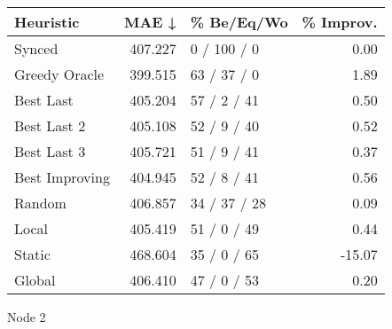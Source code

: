 \begin{tabular}{lrlr}
\toprule
\textbf{Heuristic} & \textbf{MAE ↓} & \textbf{\% Be/Eq/Wo} & \textbf{\% Improv.} \\
\midrule
            Synced &        407.227 &          0 / 100 / 0 &                0.00 \\
     Greedy Oracle &        399.515 &          63 / 37 / 0 &                1.89 \\
         Best Last &        405.204 &          57 / 2 / 41 &                0.50 \\
       Best Last 2 &        405.108 &          52 / 9 / 40 &                0.52 \\
       Best Last 3 &        405.721 &          51 / 9 / 41 &                0.37 \\
    Best Improving &        404.945 &          52 / 8 / 41 &                0.56 \\
            Random &        406.857 &         34 / 37 / 28 &                0.09 \\
             Local &        405.419 &          51 / 0 / 49 &                0.44 \\
            Static &        468.604 &          35 / 0 / 65 &              -15.07 \\
            Global &        406.410 &          47 / 0 / 53 &                0.20 \\
\bottomrule
\end{tabular}
\caption{Node 2}
\label{tab:iid_lr05_le1_bs2_2}
